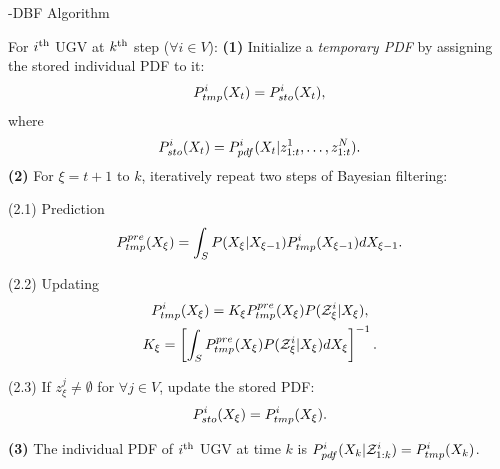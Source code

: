 	\begin{algorithm}
		\caption{\proto-DBF Algorithm}\label{alg:lifo-dbf}
		\begin{algorithmic}
			\State For $i^\text{th}$ UGV at $k^\text{th}$ step ($\forall i\in V$):
			\State\textbf{(1)} Initialize a \textit{temporary PDF} by assigning the stored individual PDF to it:
			\small\begin{equation*}
			P^i_{tmp}(X_{t})= P^i_{sto}(X_t),
			\end{equation*}\normalsize		
			where 
			\small\begin{equation*}
			P^i_{sto}(X_t) = P^i_{pdf}(X_{t}|z^1_{1:t},\dots,z^N_{1:t}).
			\end{equation*}\normalsize	
			\State\textbf{(2)} For $\xi=t+1$ to $k$, iteratively repeat two steps of Bayesian filtering:
			
			\State(2.1) Prediction 
			\small\begin{equation*}
			P_{tmp}^{pre}(X_{\xi})=\int_{S} P(X_{\xi}|X_{\xi-1})P^i_{tmp}(X_{\xi-1})dX_{\xi-1}.
			\end{equation*} \normalsize
			
			\State(2.2) Updating
			\small\begin{gather*}
			P^i_{tmp}(X_{\xi})=K_{\xi} P_{tmp}^{pre}(X_{\xi})P(\mathcal{Z}^i_{\xi}|X_{\xi}),\\
			K_{\xi}=\left[\int_S P_{tmp}^{pre}(X_{\xi})P(\mathcal{Z}^i_{\xi}|X_{\xi})dX_{\xi}\right]^{-1}.
			\end{gather*} \normalsize
			
			\State(2.3)
			If $z^j_{\xi}\neq\emptyset$ for $\forall j\in V$, update the stored PDF:
			\small\begin{equation*}
			P^i_{sto}(X_{\xi})=P^i_{tmp}(X_{\xi}).
			\end{equation*}\normalsize
			
			\State\textbf{(3)} The individual PDF of $i^\text{th}$ UGV at time $k$ is
			$P^i_{pdf}(X_{k}|\mathcal{Z}^{i}_{1:k})=P^i_{tmp}(X_k)$.		
		\end{algorithmic}
	\end{algorithm}
	
